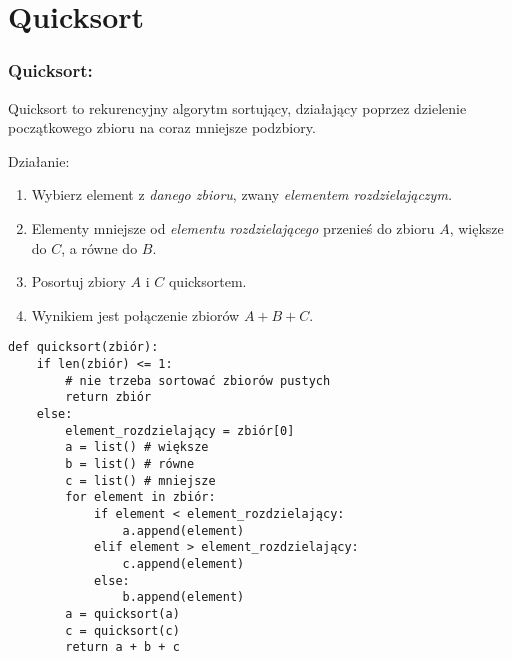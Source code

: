 \documentclass{beamer}
\begin{document}
    \section{Quicksort}
    \begin{frame}
        \frametitle{Quicksort:}
            Quicksort to rekurencyjny algorytm sortujący, działający poprzez dzielenie początkowego zbioru na coraz mniejsze podzbiory. 
            \vspace{5mm}

            Działanie:
            \begin{enumerate}
                \item Wybierz element z \emph{danego zbioru}, zwany \emph{elementem rozdzielajączym.}
                \item Elementy mniejsze od \emph{elementu rozdzielającego} przenieś do zbioru $A$, większe do $C$, a równe do $B$.
                \item Posortuj zbiory $A$ i $C$ quicksortem.
                \item Wynikiem jest połączenie zbiorów $A + B + C$.
            \end{enumerate}
    \end{frame}
    \begin{verbatim}
def quicksort(zbiór):
    if len(zbiór) <= 1:
        # nie trzeba sortować zbiorów pustych 
        return zbiór
    else:
        element_rozdzielający = zbiór[0]
        a = list() # większe
        b = list() # równe
        c = list() # mniejsze
        for element in zbiór:
            if element < element_rozdzielający:
                a.append(element)
            elif element > element_rozdzielający:
                c.append(element)
            else:
                b.append(element)
        a = quicksort(a)
        c = quicksort(c)
        return a + b + c
        
    \end{verbatim}
\end{document}
